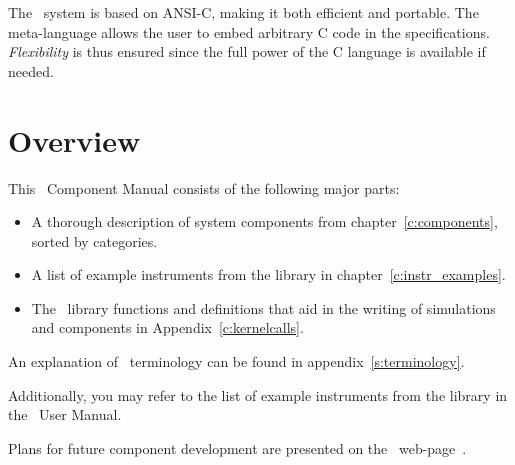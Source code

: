 The \MCX\ system is based on ANSI-C, making it both efficient and
portable. The meta-language allows the user to embed arbitrary C code in
the specifications. \textit{Flexibility} is thus ensured since the full
power of the C language is available if needed.


\section{Overview}

This \MCX\ Component Manual consists of the following major parts:
\begin{itemize}
\item A thorough description of system components 
from chapter~\ref{c:components}, sorted by categories. 
\item A list of example instruments from the library in chapter~\ref{c:instr_examples}. 
\item The \MCX\ library functions and definitions
  that aid in the writing of simulations and components in
  Appendix~\ref{c:kernelcalls}.    
\end{itemize}
An explanation of \MCX\ terminology can be
found in appendix~\ref{s:terminology}.

Additionally, you may refer to the list of example instruments from the library in the \MCX\ User Manual.

Plans for future component development are presented 
on the \MCX\ web-page~\cite{mcstas_webpage}.




